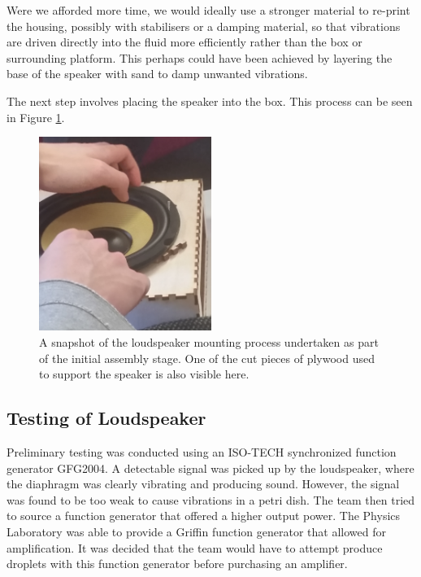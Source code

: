 Were we afforded more time, we would ideally use a stronger material to  re-print the housing, possibly with stabilisers or a damping material, so that vibrations are driven directly into the fluid more efficiently rather than the box or surrounding platform. This perhaps could have been achieved by layering the base of the speaker with sand to damp unwanted vibrations.

The next step involves placing the speaker into the box. This process can be seen in Figure \ref{fig:boxassembly}.

\begin{figure}[ht]
\centering
\includegraphics[width=0.5\textwidth]{prototype/exp_rep_imgs/boxAssembly.jpg}
\caption{A snapshot of the loudspeaker mounting process undertaken as part of the initial assembly stage. One of the cut pieces of plywood used to support the speaker is also visible here.}
\label{fig:boxassembly}
\end{figure}


\subsection{Testing of Loudspeaker}
Preliminary testing was conducted using an ISO-TECH synchronized function generator GFG2004. A detectable signal was picked up by the loudspeaker, where the diaphragm was clearly vibrating and producing sound. However, the signal was found to be too weak to cause vibrations in a petri dish. The team then tried to source a function generator that offered a higher output power. The Physics Laboratory was able to provide a Griffin function generator that allowed for amplification. It was decided that the team would have to attempt produce droplets with this function generator before purchasing an amplifier.

